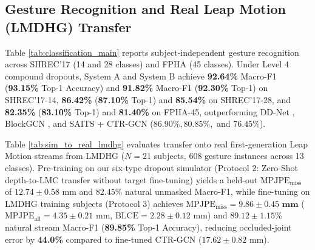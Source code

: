 \documentclass[10pt,twocolumn]{article}
\begin{document}
\subsection{Gesture Recognition and Real Leap Motion (LMDHG) Transfer}
Table \ref{tab:classification_main} reports subject-independent gesture recognition across SHREC'17 (14 and 28 classes) and FPHA (45 classes). Under Level 4 compound dropouts, System A and System B achieve \textbf{92.64\%} Macro-F1 (\textbf{93.15\%} Top-1 Accuracy) and \textbf{91.82\%} Macro-F1 (\textbf{92.30\%} Top-1) on SHREC'17-14, \textbf{86.42\%} (\textbf{87.10\%} Top-1) and \textbf{85.54\%} on SHREC'17-28, and \textbf{82.35\%} (\textbf{83.10\%} Top-1) and \textbf{81.40\%} on FPHA-45, outperforming DD-Net \cite{yang2019make}, BlockGCN \cite{zhou2024blockgcn}, and SAITS + CTR-GCN ($86.90\%, 80.85\%,$ and $76.45\%$).

Table \ref{tab:sim_to_real_lmdhg} evaluates transfer onto real first-generation Leap Motion streams from LMDHG \cite{boulahia2017dynamic} ($N=21$ subjects, $608$ gesture instances across 13 classes). Pre-training on our six-type dropout simulator (Protocol 2: Zero-Shot depth-to-LMC transfer without target fine-tuning) yields a held-out $\text{MPJPE}_{\text{miss}}$ of $12.74 \pm 0.58\text{ mm}$ and $82.45\%$ natural unmasked Macro-F1, while fine-tuning on LMDHG training subjects (Protocol 3) achieves $\text{MPJPE}_{\text{miss}} = \mathbf{9.86 \pm 0.45\text{ mm}}$ ($\text{MPJPE}_{\text{all}} = 4.35 \pm 0.21\text{ mm}$, $\text{BLCE} = 2.28 \pm 0.12\text{ mm}$) and $\mathbf{89.12 \pm 1.15\%}$ natural stream Macro-F1 (\textbf{89.85\%} Top-1 Accuracy), reducing occluded-joint error by \textbf{44.0\%} compared to fine-tuned CTR-GCN ($17.62 \pm 0.82\text{ mm}$).
\end{document}
